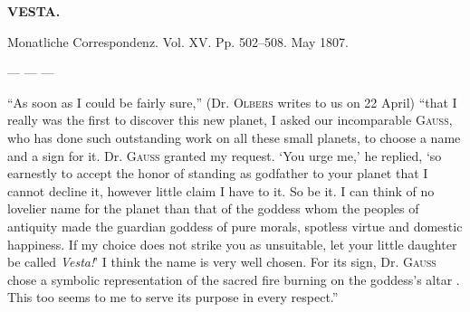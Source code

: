 \clearpage{}
\begin{center}
\textbf{VESTA.}

\hrulefill

Monatliche Correspondenz. Vol. XV. Pp. 502–508. May 1807.

\hrulefill
\end{center}

--- --- ---

\par\indent “As soon as I could be fairly sure,” (Dr. \textsc{Olbers} writes to us on 22 April) “that I really was the first to discover this new planet, I asked our incomparable \textsc{Gauss}, who has done such outstanding work on all these small planets, to choose a name and a sign for it. Dr. \textsc{Gauss} granted my request. ‘You urge me,’ he replied, ‘so earnestly to accept the honor of standing as godfather to your planet that I cannot decline it, however little claim I have to it. So be it. I can think of no lovelier name for the planet than that of the goddess whom the peoples of antiquity made the guardian goddess of pure morals, spotless virtue and domestic happiness. If my choice does not strike you as unsuitable, let your little daughter be called \emph{Vesta!}’ I think the name is very well chosen. For its sign, Dr. \textsc{Gauss} chose a symbolic representation of the sacred fire burning on the goddess’s altar \VestaAltarBody{}. This too seems to me to serve its purpose in every respect.”

\begin{flushright}
\end{flushright}
